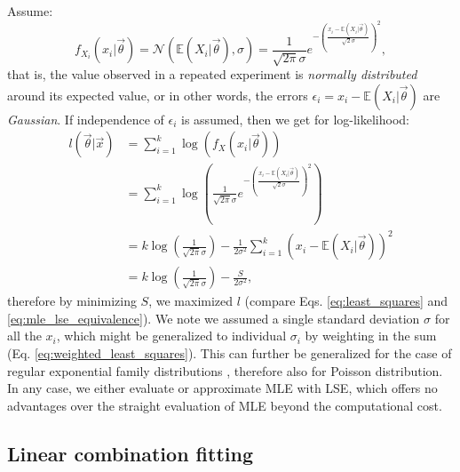 Assume: 
\begin{equation}
    f_{X_i}(x_i|\vec{\theta}) = \mathcal{N}(\mathbb{E}(X_i|\vec{\theta}),\sigma) = \frac{1}{\sqrt{2 \pi} \sigma} e^{-\left( \frac{x_i - \mathbb{E}(X_i|\vec{\theta})}{\sqrt{2} \sigma} \right)^2},
\end{equation}
that is, the value observed in a repeated experiment is \textit{normally distributed} around its expected value, or in other words, the errors $\epsilon_i = x_i - \mathbb{E}(X_i|\vec{\theta})$ are \textit{Gaussian}. If independence of $\epsilon_i$ is assumed, then we get for log-likelihood:
\begin{equation}\begin{split}
    l(\vec{\theta}|\vec{x}) 
    &= \sum_{i=1}^{k} \log \left( f_X(x_i|\vec{\theta}) \right)  \\
    &= \sum_{i=1}^{k} \log \left( \frac{1}{\sqrt{2 \pi} \sigma} e^{-\left( \frac{x_i - \mathbb{E}(X_i|\vec{\theta})}{\sqrt{2} \sigma} \right)^2} \right) \\
    &= k\log\left(\frac{1}{\sqrt{2 \pi} \sigma}\right) - \frac{1}{2 \sigma^2} \sum_{i=1}^{k} \left(  x_i - \mathbb{E}(X_i|\vec{\theta}) \right)^2 \\
    &= k\log\left(\frac{1}{\sqrt{2 \pi} \sigma}\right) - \frac{S}{2 \sigma^2}, \label{eq:mle_lse_equivalence}
\end{split}\end{equation}
therefore by minimizing $S$, we maximized $l$ (compare Eqs. \ref{eq:least_squares} and \ref{eq:mle_lse_equivalence}). We note we assumed a single standard deviation $\sigma$ for all the $x_i$, which might be generalized to individual $\sigma_i$ by weighting in the sum (Eq. \ref{eq:weighted_least_squares}). This can further be generalized for the case of regular exponential family distributions \citep{charnes1976equivalence}, therefore also for Poisson distribution. In any case, we either evaluate or approximate MLE with LSE, which offers no advantages over the straight evaluation of MLE beyond the computational cost.

\subsection{Linear combination fitting}

